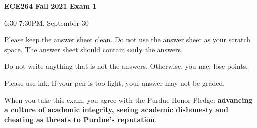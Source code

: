 
\newif\ifexam
\examfalse






\begin{center}
\begin{huge}
{\bf
ECE264 Fall 2021
Exam 1\vspace{0.4in}

6:30-7:30PM, September 30
}

\vspace{1in}
\end{huge}

\begin{LARGE}
Please keep the answer sheet clean. Do not use the answer
sheet as your scratch space.
The answer sheet should contain {\bf only} the answers.  
\vspace{1in}

Do not write
anything that is not the answers.  Otherwise, you may lose points.

\vspace{0.5in}

Please use  ink. If your pen is too light,
your answer may not be graded.

\end{LARGE}
\vspace{0.5in}

\begin{large}
When you take this exam, you agree with the Purdue Honor Pledge: {\bf
advancing a culture of academic integrity, seeing academic dishonesty
and cheating as threats to Purdue’s reputation}.
\end{large}

\end{center}

\clearpage

